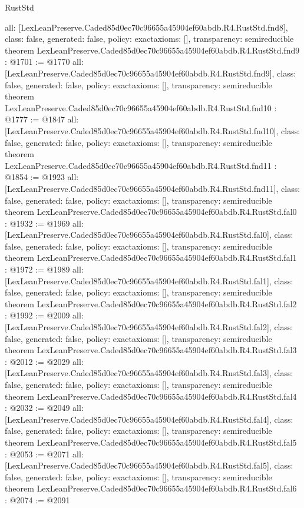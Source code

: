 \begin{lexlean}{RustStd}
\begin{coremodule}
{  all: [LexLeanPreserve.Caded85d0ec70c96655a45904ef60abdb.R4.RustStd.fnd8],
  class: false,
  generated: false,
  policy: exact{axioms: []},
  transparency: semireducible
}
theorem LexLeanPreserve.Caded85d0ec70c96655a45904ef60abdb.R4.RustStd.fnd9 : @1701 := @1770 {
  all: [LexLeanPreserve.Caded85d0ec70c96655a45904ef60abdb.R4.RustStd.fnd9],
  class: false,
  generated: false,
  policy: exact{axioms: []},
  transparency: semireducible
}
theorem LexLeanPreserve.Caded85d0ec70c96655a45904ef60abdb.R4.RustStd.fnd10 : @1777 := @1847 {
  all: [LexLeanPreserve.Caded85d0ec70c96655a45904ef60abdb.R4.RustStd.fnd10],
  class: false,
  generated: false,
  policy: exact{axioms: []},
  transparency: semireducible
}
theorem LexLeanPreserve.Caded85d0ec70c96655a45904ef60abdb.R4.RustStd.fnd11 : @1854 := @1923 {
  all: [LexLeanPreserve.Caded85d0ec70c96655a45904ef60abdb.R4.RustStd.fnd11],
  class: false,
  generated: false,
  policy: exact{axioms: []},
  transparency: semireducible
}
theorem LexLeanPreserve.Caded85d0ec70c96655a45904ef60abdb.R4.RustStd.fal0 : @1932 := @1969 {
  all: [LexLeanPreserve.Caded85d0ec70c96655a45904ef60abdb.R4.RustStd.fal0],
  class: false,
  generated: false,
  policy: exact{axioms: []},
  transparency: semireducible
}
theorem LexLeanPreserve.Caded85d0ec70c96655a45904ef60abdb.R4.RustStd.fal1 : @1972 := @1989 {
  all: [LexLeanPreserve.Caded85d0ec70c96655a45904ef60abdb.R4.RustStd.fal1],
  class: false,
  generated: false,
  policy: exact{axioms: []},
  transparency: semireducible
}
theorem LexLeanPreserve.Caded85d0ec70c96655a45904ef60abdb.R4.RustStd.fal2 : @1992 := @2009 {
  all: [LexLeanPreserve.Caded85d0ec70c96655a45904ef60abdb.R4.RustStd.fal2],
  class: false,
  generated: false,
  policy: exact{axioms: []},
  transparency: semireducible
}
theorem LexLeanPreserve.Caded85d0ec70c96655a45904ef60abdb.R4.RustStd.fal3 : @2012 := @2029 {
  all: [LexLeanPreserve.Caded85d0ec70c96655a45904ef60abdb.R4.RustStd.fal3],
  class: false,
  generated: false,
  policy: exact{axioms: []},
  transparency: semireducible
}
theorem LexLeanPreserve.Caded85d0ec70c96655a45904ef60abdb.R4.RustStd.fal4 : @2032 := @2049 {
  all: [LexLeanPreserve.Caded85d0ec70c96655a45904ef60abdb.R4.RustStd.fal4],
  class: false,
  generated: false,
  policy: exact{axioms: []},
  transparency: semireducible
}
theorem LexLeanPreserve.Caded85d0ec70c96655a45904ef60abdb.R4.RustStd.fal5 : @2053 := @2071 {
  all: [LexLeanPreserve.Caded85d0ec70c96655a45904ef60abdb.R4.RustStd.fal5],
  class: false,
  generated: false,
  policy: exact{axioms: []},
  transparency: semireducible
}
theorem LexLeanPreserve.Caded85d0ec70c96655a45904ef60abdb.R4.RustStd.fal6 : @2074 := @2091 {
}
\end{coremodule}
\end{lexlean}
